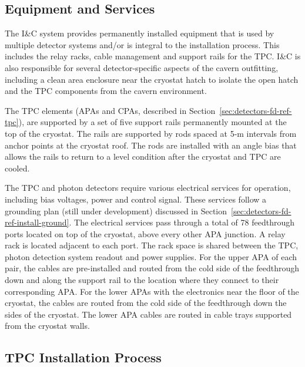 \subsection{Equipment and Services}

The I\&C system provides 
permanently installed equipment that is used by multiple detector
systems and/or is integral to the installation process. This 
includes the relay racks, cable management and support rails for the TPC.
I\&C is also responsible for several detector-specific aspects of the cavern outfitting, including a clean area enclosure near the cryostat hatch to 
isolate  the open hatch and the TPC components
from the cavern environment. 

The TPC elements (APAs and CPAs, described in Section~\ref{sec:detectors-fd-ref-tpc}), are
supported by a set of five support rails permanently mounted at the
top of the cryostat. The rails are supported
by rods spaced at 5-m intervals from anchor points at the cryostat
roof. The rods are installed with an angle bias that allows the
rails to return to a level condition after the cryostat and TPC are
cooled. 

The TPC and photon detectors require various electrical services
for operation, including bias voltages, power and control signal. These services
follow a grounding plan (still under development) 
discussed in Section~\ref{sec:detectors-fd-ref-install-ground}.  The
electrical services pass through a total of 78 feedthrough ports located on top of the
cryostat, above every other APA junction.  A relay rack is located
adjacent to each port. The rack space is shared between the TPC,
photon detection system readout and power supplies. For the upper APA of each pair,
the cables are pre-installed and routed from the cold side of the
feedthrough down and along the support rail to the location where they
connect to their corresponding APA. For the lower APAs with the
electronics near the floor of the cryostat, the cables are routed
from the cold side of the feedthrough down the sides of the
cryostat. The lower APA cables are routed in cable trays supported
from the cryostat walls.

\subsection{TPC Installation Process}

